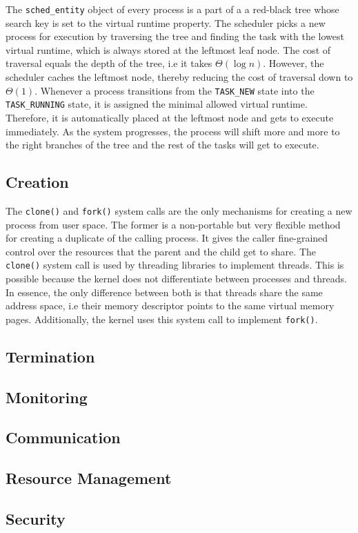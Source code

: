 The \verb|sched_entity| object of every process is a part of a 
a red-black tree whose search key is set to the virtual runtime property. The scheduler picks a new process 
for execution by traversing the tree and finding the task with the lowest virtual runtime, which is always 
stored at the leftmost leaf node. The cost of traversal equals the depth of the tree, i.e it takes $\Theta{(\log{n})}$.
However, the scheduler caches the leftmost node, thereby reducing the cost of traversal down to $\Theta{(1)}$.
Whenever a process transitions from the \verb|TASK_NEW| state into the \verb|TASK_RUNNING| state, 
it is assigned the minimal allowed virtual runtime. Therefore, it is automatically 
placed at the leftmost node and gets to execute immediately. As the system progresses, the process will
shift more and more to the right branches of the tree and the rest of the tasks will get to execute.

\subsection{Creation}
\label{ch:fundamentals/processes/creation}
The \verb|clone()| and \verb|fork()| system calls are the only mechanisms for creating a 
new process from user space. The former is a non-portable but very flexible method for creating a
duplicate of the calling process. It gives the caller fine-grained control over the resources that 
the parent and the child get to share. 
The \verb|clone()| system call is used by threading libraries to implement threads. 
This is possible because the kernel does not differentiate between processes and threads. 
In essence, the only difference between both is that threads share the same address space, i.e 
their memory descriptor points to the same virtual memory pages. Additionally, the kernel 
uses this system call to implement \verb|fork()|. 

\subsection{Termination}
\label{ch:fundamentals/processes/termination}
\subsection{Monitoring}
\label{ch:fundamentals/processes/monitoring}
\subsection{Communication}
\label{ch:fundamentals/processes/communication}
\subsection{Resource Management}
\label{ch:fundamentals/processes/resource-management}
\subsection{Security}
\label{ch:fundamentals/processes/security}